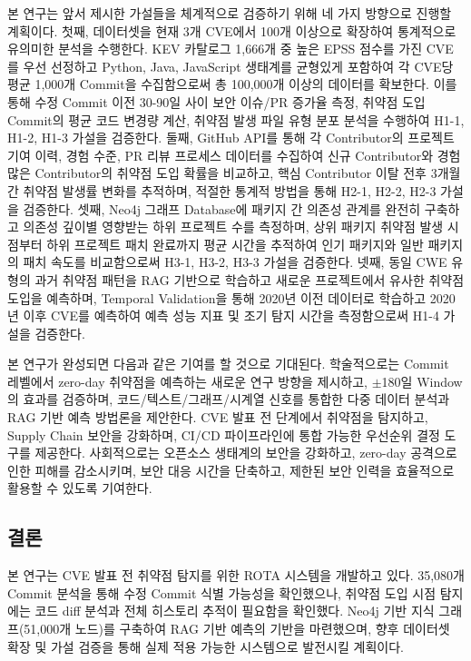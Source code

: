 ﻿\documentclass[conference]{IEEEtran}
\begin{document}
본 연구는 앞서 제시한 가설들을 체계적으로 검증하기 위해 네 가지 방향으로 진행할 계획이다. 첫째, 데이터셋을 현재 3개 CVE에서 100개 이상으로 확장하여 통계적으로 유의미한 분석을 수행한다. KEV 카탈로그 1,666개 중 높은 EPSS 점수를 가진 CVE를 우선 선정하고 Python, Java, JavaScript 생태계를 균형있게 포함하여 각 CVE당 평균 1,000개 Commit을 수집함으로써 총 100,000개 이상의 데이터를 확보한다. 이를 통해 수정 Commit 이전 30-90일 사이 보안 이슈/PR 증가율 측정, 취약점 도입 Commit의 평균 코드 변경량 계산, 취약점 발생 파일 유형 분포 분석을 수행하여 H1-1, H1-2, H1-3 가설을 검증한다. 둘째, GitHub API를 통해 각 Contributor의 프로젝트 기여 이력, 경험 수준, PR 리뷰 프로세스 데이터를 수집하여 신규 Contributor와 경험 많은 Contributor의 취약점 도입 확률을 비교하고, 핵심 Contributor 이탈 전후 3개월간 취약점 발생률 변화를 추적하며, 적절한 통계적 방법을 통해 H2-1, H2-2, H2-3 가설을 검증한다. 셋째, Neo4j 그래프 Database에 패키지 간 의존성 관계를 완전히 구축하고 의존성 깊이별 영향받는 하위 프로젝트 수를 측정하며, 상위 패키지 취약점 발생 시점부터 하위 프로젝트 패치 완료까지 평균 시간을 추적하여 인기 패키지와 일반 패키지의 패치 속도를 비교함으로써 H3-1, H3-2, H3-3 가설을 검증한다. 넷째, 동일 CWE 유형의 과거 취약점 패턴을 RAG 기반으로 학습하고 새로운 프로젝트에서 유사한 취약점 도입을 예측하며, Temporal Validation을 통해 2020년 이전 데이터로 학습하고 2020년 이후 CVE를 예측하여 예측 성능 지표 및 조기 탐지 시간을 측정함으로써 H1-4 가설을 검증한다.

본 연구가 완성되면 다음과 같은 기여를 할 것으로 기대된다. 학술적으로는 Commit 레벨에서 zero-day 취약점을 예측하는 새로운 연구 방향을 제시하고, $\pm$180일 Window의 효과를 검증하며, 코드/텍스트/그래프/시계열 신호를 통합한 다중 데이터 분석과 RAG 기반 예측 방법론을 제안한다. CVE 발표 전 단계에서 취약점을 탐지하고, Supply Chain 보안을 강화하며, CI/CD 파이프라인에 통합 가능한 우선순위 결정 도구를 제공한다. 사회적으로는 오픈소스 생태계의 보안을 강화하고, zero-day 공격으로 인한 피해를 감소시키며, 보안 대응 시간을 단축하고, 제한된 보안 인력을 효율적으로 활용할 수 있도록 기여한다.

\subsection{결론}

본 연구는 CVE 발표 전 취약점 탐지를 위한 ROTA 시스템을 개발하고 있다. 35,080개 Commit 분석을 통해 수정 Commit 식별 가능성을 확인했으나, 취약점 도입 시점 탐지에는 코드 diff 분석과 전체 히스토리 추적이 필요함을 확인했다. Neo4j 기반 지식 그래프(51,000개 노드)를 구축하여 RAG 기반 예측의 기반을 마련했으며, 향후 데이터셋 확장 및 가설 검증을 통해 실제 적용 가능한 시스템으로 발전시킬 계획이다.
\end{document}
